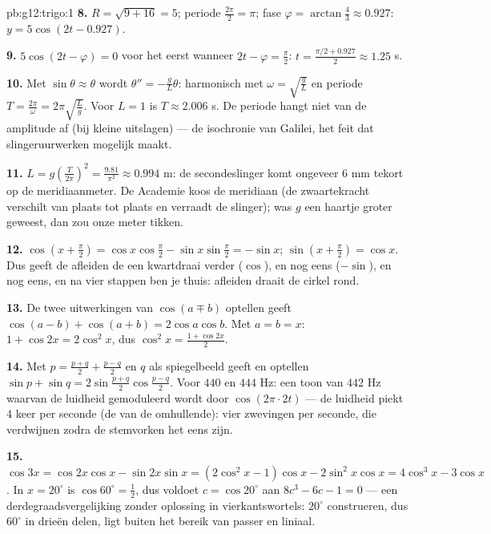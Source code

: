 \begin{solution}{pb:g12:trigo:1}
\textbf{8.} $R = \sqrt{9 + 16} = 5$; periode $\frac{2\pi}{2} = \pi$; fase
$\varphi = \arctan\frac43 \approx 0.927$: $y = 5\cos(2t - 0.927)$.

\textbf{9.} $5\cos(2t - \varphi) = 0$ voor het eerst wanneer
$2t - \varphi = \frac\pi2$: $t = \frac{\pi/2 + 0.927}{2} \approx 1.25$ s.

\textbf{10.} Met $\sin\theta \approx \theta$ wordt
$\theta'' = -\frac gL \theta$: harmonisch met $\omega = \sqrt{\frac gL}$ en
periode $T = \frac{2\pi}{\omega} = 2\pi\sqrt{\frac Lg}$. Voor $L = 1$ is
$T \approx 2.006$ s. De periode hangt niet van de amplitude af (bij kleine
uitslagen) --- de isochronie van Galilei, het feit dat slingeruurwerken
mogelijk maakt.

\textbf{11.} $L = g\left(\frac{T}{2\pi}\right)^2 = \frac{9.81}{\pi^2}
\approx 0.994$ m: de secondeslinger komt ongeveer $6$ mm tekort op de
meridiaanmeter. De Academie koos de meridiaan (de zwaartekracht verschilt van
plaats tot plaats en verraadt de slinger); was $g$ een haartje groter
geweest, dan zou onze meter tikken.

\textbf{12.} $\cos\left(x + \frac\pi2\right) =
\cos x \cos\frac\pi2 - \sin x \sin\frac\pi2 = -\sin x$;
$\sin\left(x + \frac\pi2\right) = \cos x$. Dus geeft de  afleiden de
 een kwartdraai verder ($\cos$), en nog eens ($-\sin$), en nog eens, en
na vier stappen ben je thuis: afleiden draait de cirkel rond.

\textbf{13.} De twee uitwerkingen van $\cos(a \mp b)$ optellen geeft
$\cos(a-b) + \cos(a+b) = 2\cos a\cos b$. Met $a = b = x$:
$1 + \cos 2x = 2\cos^2 x$, dus $\cos^2 x = \frac{1 + \cos 2x}{2}$.

\textbf{14.} Met $p = \frac{p+q}{2} + \frac{p-q}{2}$ en $q$ als spiegelbeeld
geeft  en optellen
$\sin p + \sin q = 2\sin\frac{p+q}{2}\cos\frac{p-q}{2}$. Voor $440$ en
$444$ Hz: een toon van $442$ Hz waarvan de luidheid gemoduleerd wordt door
$\cos(2\pi \cdot 2t)$ --- de luidheid piekt $4$ keer per seconde (de  van de omhullende): vier zwevingen per seconde, die verdwijnen zodra
de stemvorken het eens zijn.

\textbf{15.} $\cos 3x = \cos 2x\cos x - \sin 2x \sin x =
(2\cos^2 x - 1)\cos x - 2\sin^2 x\cos x = 4\cos^3 x - 3\cos x$. In
$x = 20^\circ$ is $\cos 60^\circ = \frac12$, dus voldoet
$c = \cos 20^\circ$ aan $8c^3 - 6c - 1 = 0$ --- een derdegraadsvergelijking
zonder oplossing in vierkantswortels: $20^\circ$ construeren, dus $60^\circ$
in drieën delen, ligt buiten het bereik van passer en liniaal.


\end{solution}
